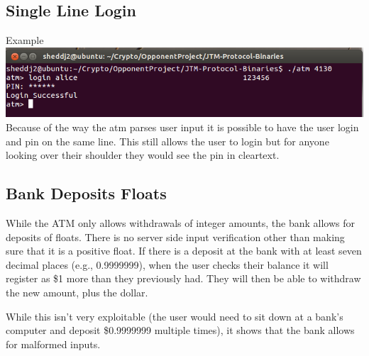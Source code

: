 \documentclass{article}
\begin{document}
\subsection{Single Line Login}
Example
\\
\includegraphics[scale=0.65]{OneLineLogin.png}
\\
Because of the way the atm parses user input it is possible to have the user login and pin on the same line. This still allows the user to login but for anyone looking over their shoulder they would see the pin in cleartext.

\subsection{Bank Deposits Floats}
While the ATM only allows withdrawals of integer amounts, the bank allows for deposits of floats. There is no server side input verification other than making sure that it is a positive float. If there is a deposit at the bank with at least seven decimal places (e.g., 0.9999999), when the user checks their balance it will register as \$1 more than they previously had. They will then be able to withdraw the new amount, plus the dollar.

While this isn't very exploitable (the user would need to sit down at a bank's computer and deposit \$0.9999999 multiple times), it shows that the bank allows for malformed inputs.
\end{document}
